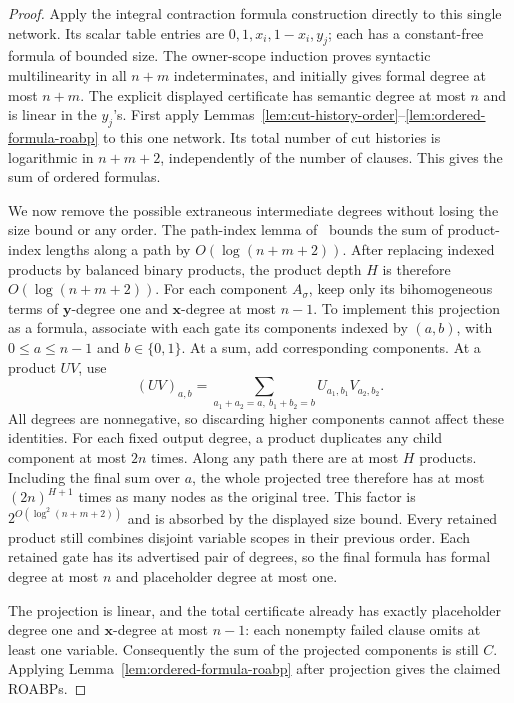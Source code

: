 \documentclass[11pt]{article}
\theoremstyle{definition}
\theoremstyle{remark}
\begin{document}
\begin{proof}
Apply the integral contraction formula construction directly to this
single network. Its scalar table entries are $0,1,x_i,1-x_i,y_j$;
each has a constant-free formula of bounded size. The owner-scope
induction proves syntactic multilinearity in all $n+m$
indeterminates, and initially gives formal degree at most $n+m$.
The explicit displayed certificate has semantic degree at most $n$
and is linear in the $y_j$'s. First apply
Lemmas~\ref{lem:cut-history-order}--\ref{lem:ordered-formula-roabp}
to this one network. Its total number of cut histories is logarithmic
in $n+m+2$, independently of the number of clauses. This gives the
sum of ordered formulas.

We now remove the possible extraneous intermediate degrees without
losing the size bound or any order. The path-index lemma
of~\cite{Cruz26} bounds the sum of product-index lengths along a
path by $O(\log(n+m+2))$. After replacing indexed products by balanced
binary products, the product depth $H$ is therefore
$O(\log(n+m+2))$. For each component $A_\sigma$, keep only its
bihomogeneous terms of $\mathbf y$-degree one and $\mathbf x$-degree
at most $n-1$. To implement this projection as a formula, associate
with each gate its components indexed by $(a,b)$, with
$0\le a\le n-1$ and $b\in\{0,1\}$. At a sum, add corresponding
components. At a product $UV$, use
\[
 (UV)_{a,b}=\sum_{a_1+a_2=a,\ b_1+b_2=b}
                 U_{a_1,b_1}V_{a_2,b_2}.
\]
All degrees are nonnegative, so discarding higher components cannot
affect these identities. For each fixed output degree, a product
duplicates any child component at most $2n$ times. Along any path
there are at most $H$ products. Including the final sum over $a$,
the whole projected tree therefore has at most $(2n)^{H+1}$ times
as many nodes as the original tree. This factor is
$2^{O(\log^2(n+m+2))}$ and is absorbed by the displayed size bound.
Every retained product still combines disjoint variable scopes in
their previous order. Each retained gate has its advertised pair of
degrees, so the final formula has formal degree at most $n$ and
placeholder degree at most one.

The projection is linear, and the total certificate already has
exactly placeholder degree one and $\mathbf x$-degree at most $n-1$:
each nonempty failed clause omits at least one variable. Consequently
the sum of the projected components is still $C$. Applying
Lemma~\ref{lem:ordered-formula-roabp} after projection gives the
claimed ROABPs.
\end{proof}
\end{document}
